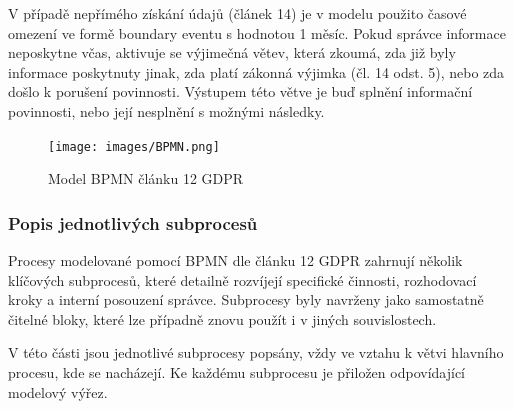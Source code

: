 \begin{enumerate}
  V případě nepřímého získání údajů (článek 14) je v modelu použito časové omezení ve formě boundary eventu s hodnotou 1 měsíc. Pokud správce informace neposkytne včas, aktivuje se výjimečná větev, která zkoumá, zda již byly informace poskytnuty jinak, zda platí zákonná výjimka (čl. 14 odst. 5), nebo zda došlo k porušení povinnosti. Výstupem této větve je buď splnění informační povinnosti, nebo její nesplnění s možnými následky.

\end{enumerate}

\begin{figure}[H]
  \centering
  \texttt{[image: images/BPMN.png]}
  \caption{Model BPMN článku 12 GDPR}
  \label{fig:bpmn}
\end{figure}


\subsubsection{Popis jednotlivých subprocesů}
\label{sec:bpmn-popis-subprocesu}
Procesy modelované pomocí BPMN dle článku 12 GDPR zahrnují několik klíčových subprocesů, které detailně rozvíjejí specifické činnosti, rozhodovací kroky a interní posouzení správce. Subprocesy byly navrženy jako samostatně čitelné bloky, které lze případně znovu použít i v jiných souvislostech.

V této části jsou jednotlivé subprocesy popsány, vždy ve vztahu k větvi hlavního procesu, kde se nacházejí. Ke každému subprocesu je přiložen odpovídající modelový výřez.

